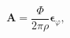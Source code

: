 \begin{equation}
\mathbf{A}=
\frac{\Phi }{2\pi \rho }\mathbf{\epsilon}_{\varphi},
\label{eq1}
\end{equation}

